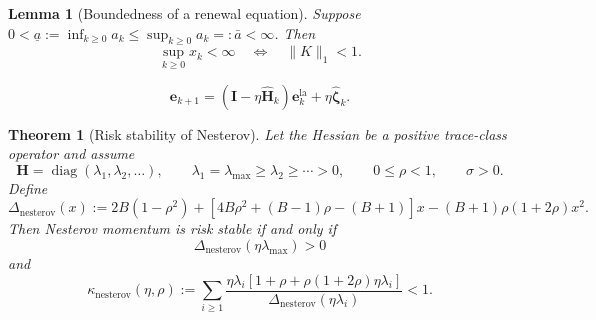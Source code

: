 \documentclass[10pt,a4paper]{amsart}
\newtheorem{lemma}{Lemma}
\newtheorem{theorem}{Theorem}
\newcommand{\bH}{\fbf{H}}
\newcommand{\bI}{\fbf{I}}
\newcommand{\be}{\mathrm{\fbf{e}}}
\DeclareMathOperator{\diag}{diag}
\newcommand{\fbf}[1]{\mathbf{#1}}
\renewcommand{\geq}{\geqslant}
\newcommand{\la}{\mathrm{la}}
\renewcommand{\leq}{\leqslant}
\newcommand{\nesterov}{\mathrm{nesterov}}
\begin{document}
\begin{lemma}[Boundedness of a renewal equation]
\label{app:lem:renewal-stability}
Suppose \(0<\underline a:=\inf_{k\geq0}a_k\leq\sup_{k\geq0}a_k=:\bar a<\infty\). Then
\[
\sup_{k\geq0}x_k<\infty\quad\Longleftrightarrow\quad \|K\|_1<1.
\]
\end{lemma}

\begin{equation}
\label{app:eq:nesterov-stability-recursion}
\be_{k+1}
=
(\bI-\eta\widehat{\bH}_k)\be_k^{\la}
+
\eta\widehat{\boldsymbol\zeta}_k.
\end{equation}

\begin{theorem}[Risk stability of Nesterov]
\label{app:thm:nesterov-stability}
Let the Hessian be a positive trace-class operator and assume
\[
\bH=\diag(\lambda_1,\lambda_2,\ldots),
\qquad
\lambda_1=\lambda_{\max}\geq\lambda_2\geq\cdots>0,
\qquad
0\leq\rho<1,
\qquad
\sigma>0.
\]
Define
\[
\Delta_{\nesterov}(x)
:=
2B(1-\rho^2)
+
\left[4B\rho^2+(B-1)\rho-(B+1)\right]x
-
(B+1)\rho(1+2\rho)x^2.
\]
Then Nesterov momentum is risk stable if and only if
\begin{equation}
\label{app:eq:nesterov-local-stability}
\Delta_{\nesterov}(\eta\lambda_{\max})>0
\end{equation}
and
\begin{equation}
\label{app:eq:nesterov-global-stability}
\kappa_{\nesterov}(\eta,\rho)
:=
\sum_{i\geq1}
\frac{
\eta\lambda_i
\left[1+\rho+\rho(1+2\rho)\eta\lambda_i\right]
}{
\Delta_{\nesterov}(\eta\lambda_i)
}
<1.
\end{equation}
\end{theorem}
\end{document}
